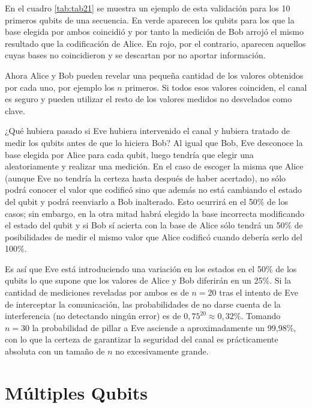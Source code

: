 En el cuadro \ref{tab:tab21} se muestra un ejemplo de esta validación para los 10 primeros qubits de una secuencia. En verde aparecen los qubits para los que la base elegida por ambos coincidió y por tanto la medición de Bob arrojó el mismo resultado que la codificación de Alice. En rojo, por el contrario, aparecen aquellos cuyas bases no coincidieron y se descartan por no aportar información.

Ahora Alice y Bob pueden revelar una pequeña cantidad de los valores obtenidos por cada uno, por ejemplo los $n$ primeros. Si todos esos valores coinciden, el canal es seguro y pueden utilizar el resto de los valores medidos no desvelados como clave. 

¿Qué hubiera pasado si Eve hubiera intervenido el canal y hubiera tratado de medir los qubits antes de que lo hiciera Bob?
%
Al igual que Bob, Eve desconoce la base elegida por Alice para cada qubit, luego tendría que elegir una aleatoriamente  y realizar una medición. En el caso de escoger la misma que Alice (aunque Eve no tendría la certeza hasta después de haber acertado), no sólo podrá conocer el valor que codificó sino que además no está cambiando el estado del qubit y podrá reenviarlo a Bob inalterado. Esto ocurrirá en el 50\% de los casos; sin embargo, en la otra mitad habrá elegido la base incorrecta modificando el estado del qubit y si Bob sí acierta con la base de Alice sólo tendrá un 50\% de posibilidades de medir el mismo valor que Alice codificó cuando debería serlo del 100\%.

Es así que Eve está introduciendo una variación en los estados en el 50\% de los qubits lo que supone que los valores de Alice y Bob diferirán en un 25\%. Si la cantidad de mediciones reveladas por ambos es de $n=20$ tras el intento de Eve de interceptar la comunicación, las probabilidades de no darse cuenta de la interferencia (no detectando ningún error) es de $0,75^{20}\approx0,32\%$. Tomando $n=30$ la probabilidad de pillar a Eve asciende a aproximadamente un 99,98\%, con lo que la certeza de garantizar la seguridad del canal es prácticamente absoluta con un tamaño de $n$ no excesivamente grande.

\section{Múltiples Qubits}

